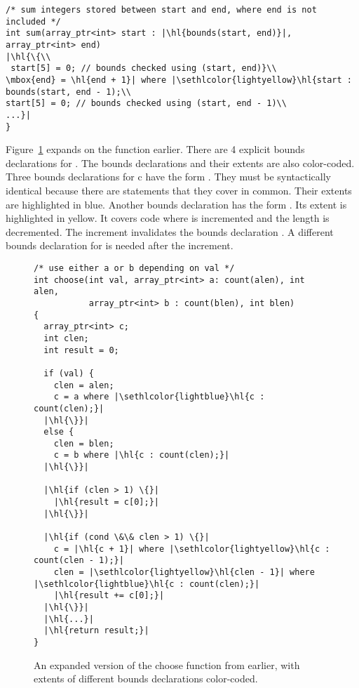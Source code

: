 \begin{lstlisting}[escapechar=\|]
/* sum integers stored between start and end, where end is not included */  
int sum(array_ptr<int> start : |\hl{bounds(start, end)}|, array_ptr<int> end)
|\hl{\{\\
 start[5] = 0; // bounds checked using (start, end)}\\
\mbox{end} = \hl{end + 1}| where |\sethlcolor{lightyellow}\hl{start : bounds(start, end - 1);\\
start[5] = 0; // bounds checked using (start, end - 1)\\
...}|
}
\end{lstlisting}

Figure~\ref{fig:bounds-extent:choose} expands on the  function earlier. 
There are 4 explicit bounds declarations for . The bounds declarations
and their extents are also color-coded. Three bounds declarations for c
have the form . They must be syntactically
identical because there are statements that they cover in common. Their
extents are highlighted in blue.  Another bounds declaration has
the form .   Its extent is highlighted
in yellow. It covers code where  is incremented and the 
length is decremented.  The increment invalidates the bounds declaration
.  A different bounds declaration for 
is needed after the increment.

\begin{figure}
\begin{lstlisting}[escapechar=\|]
/* use either a or b depending on val */
int choose(int val, array_ptr<int> a: count(alen), int alen,
           array_ptr<int> b : count(blen), int blen)
{
  array_ptr<int> c;
  int clen;
  int result = 0;

  if (val) {
    clen = alen;
    c = a where |\sethlcolor{lightblue}\hl{c : count(clen);}|
  |\hl{\}}|
  else {
    clen = blen;
    c = b where |\hl{c : count(clen);}|
  |\hl{\}}|
  
  |\hl{if (clen > 1) \{}|
    |\hl{result = c[0];}|
  |\hl{\}}|
  
  |\hl{if (cond \&\& clen > 1) \{}|
    c = |\hl{c + 1}| where |\sethlcolor{lightyellow}\hl{c : count(clen - 1);}|
    clen = |\sethlcolor{lightyellow}\hl{clen - 1}| where |\sethlcolor{lightblue}\hl{c : count(clen);}|
    |\hl{result += c[0];}|
  |\hl{\}}| 
  |\hl{...}|
  |\hl{return result;}|
}
\end{lstlisting}
\caption{An expanded version of the choose function from earlier, with extents of different bounds declarations color-coded.}
\label{fig:bounds-extent:choose}
\end{figure}

